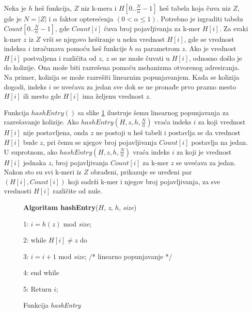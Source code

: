 \documentclass[12pt,oneside]{memoir}
\begin{document}
Neka je $h$ heš funkcija, $Z$ niz k-mera i $H[0..\frac{N}{\alpha} - 1]$ heš tabela koja čuva niz $Z$, gde je $N = |Z|$ i $\alpha$ faktor opterećenja $(0 < \alpha \leq 1)$. Potrebno je izgraditi tabelu $Count[0..\frac{N}{\alpha} - 1]$, gde $Count[i]$ čuva broj pojavljivanja za k-mer $H[i]$. Za svaki k-mer $z$ iz $Z$ vrši se njegovo heširanje u neku vrednost $H[i]$, gde se vrednost indeksa $i$ izračunava pomoću heš funkcije $h$ sa parametrom $z$. Ako je vrednost $H[i]$ postvaljena i različita od $z$, $z$ se ne može čuvati u $H[i]$, odnosno došlo je do kolizije. Ona može biti razrešena pomoću mehanizma otvorenog adresiranja. Na primer, kolizija se može razrešiti linearnim popunjavanjem. Kada se kolizija dogodi, indeks $i$ se uvećava za jedan sve dok se ne pronađe prvo prazno mesto $H[i]$ ili mesto gde $H[i]$ ima željenu vrednost $z$.

\begin{comment}

\begin{figure}[!ht]
  \centering
  \texttt{[image: HashEntry.PNG]}
  \caption{Funkcija hashEntry \cite{WingKinSung}}
  \label{fig:hashEntry}
\end{figure}

\end{comment}

Funkcija $hashEntry()$ sa slike \ref{box:hashEntry} ilustruje šemu linearnog popunjavanja za razrešavanje kolizije. Ako $hashEntry(H, z, h, \frac{N}{\alpha})$ vraća indeks $i$ za koji vrednost $H[i]$ nije postavljena, onda $z$ ne postoji u heš tabeli i postavlja se da vrednost $H[i]$ bude $z$, pri čemu se njegov broj pojavljivanja $Count[i]$ postavlja na jedan. U suprotnom, ako $hashEntry(H, z, h, \frac{N}{\alpha})$ vraća indeks $i$ za koji je vrednost $H[i]$ jednaka $z$, broj pojavljivanja $Count[i]$ za k-mer $z$ se uvećava za jedan. Nakon sto su svi k-meri iz $Z$ obrađeni, prikazuje se uređeni par $(H[i], Count[i])$ koji sadrži k-mer i njegov broj pojavljivanja, za sve vrednosti $H[i]$ različite od nule.

\begin{figure}[!ht]
\begin{tcolorbox}
\textbf{Algoritam hashEntry}($H$, \textit{z}, $h$, \textit{size})

1: $i = h(z)$ mod \textit{size};

2: while $H[i] \neq z$ do

3:\hspace{1cm} $i = i + 1$ mod \textit{size}; $/$* linearno popunjavanje *$/$

4: end while

5: Return $i$;
\end{tcolorbox}
\caption{Funkcija \textit{hashEntry} \cite{WingKinSung}}
\label{box:hashEntry}
\end{figure}
\end{document}
